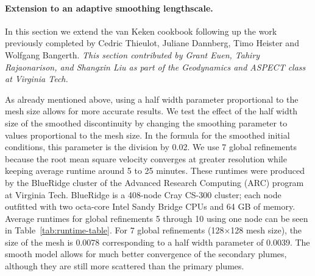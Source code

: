 \documentclass{article}
\begin{document}
\paragraph*{Extension to an adaptive smoothing lengthscale.}
In this section we extend the van Keken cookbook following up the work previously completed by Cedric Thieulot, Juliane Dannberg,
Timo Heister and Wolfgang Bangerth.  \textit{This section contributed by Grant Euen, Tahiry Rajaonarison, and Shangxin Liu as part of the Geodynamics and ASPECT class at Virginia Tech.}

As already mentioned above, using a half width parameter proportional to the mesh size allows for more accurate results.  We test the effect of the half width size of the smoothed discontinuity by changing the smoothing parameter to values proportional to the mesh size.  In the formula for the smoothed initial conditions, this parameter is the division by 0.02.  We use 7 global refinements because the root mean square velocity converges at greater resolution while keeping average runtime around 5 to 25 minutes.  These runtimes were produced by the BlueRidge cluster of the Advanced Research Computing (ARC) program at Virginia Tech.  BlueRidge is a 408-node Cray CS-300 cluster; each node outfitted with two octa-core Intel Sandy Bridge CPUs and 64 GB of memory.  Average runtimes for global refinements 5 through 10 using one node can be seen in Table~\ref{tab:runtime-table}.  For 7 global refinements (128$\times$128 mesh size), the size of the mesh is 0.0078 corresponding to a half width parameter of 0.0039.  The smooth model allows for much better convergence of the secondary plumes, although they are still more scattered than the primary plumes.
\end{document}

